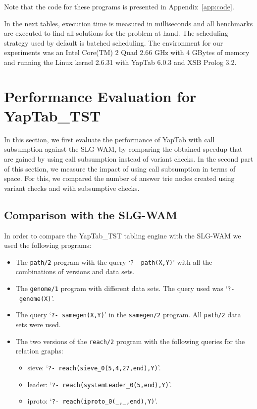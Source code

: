 Note that the code for these programs is presented in Appendix~\ref{app:code}.

In the next tables, execution time is measured in milliseconds and all benchmarks
are executed to find all solutions for the problem at hand. The scheduling strategy used
by default is batched scheduling.
The environment for our experiments was an Intel Core(TM) 2 Quad 2.66 GHz with 4 GBytes of
memory and running the Linux kernel 2.6.31 with YapTab 6.0.3 and XSB Prolog 3.2.

\section{Performance Evaluation for YapTab\_TST}

In this section, we first evaluate the performance of YapTab with call subsumption against the SLG-WAM,
by comparing the obtained speedup that are gained by using call subsumption instead of variant checks.
In the second part of this section, we measure the impact of using call subsumption in terms of space.
For this, we compared the number of answer trie nodes created using variant checks and with subsumptive
checks.

\subsection{Comparison with the SLG-WAM}

In order to compare the YapTab\_TST tabling engine with the SLG-WAM we used the following programs:

\begin{itemize}
   \item The \texttt{path/2} program with the query `\texttt{?-~path(X,Y)}' with all the combinations of
   versions and data sets.
   \item The \texttt{genome/1} program with different data sets. The query used was `\texttt{?-~genome(X)}'.
   
   \item The query `\texttt{?-~samegen(X,Y)}' in the \texttt{samegen/2} program. All \texttt{path/2} data
   sets were used.
   
   \item The two versions of the \texttt{reach/2} program with the following queries for the relation graphs:

   \begin{itemize}
      \item sieve: `\texttt{?-~reach(sieve\_0(5,4,27,end),Y)}'.
      \item leader: `\texttt{?-~reach(systemLeader\_0(5,end),Y)}'.
      \item iproto: `\texttt{?-~reach(iproto\_0(\_,\_,end),Y)}'.
   \end{itemize}

\end{itemize}


